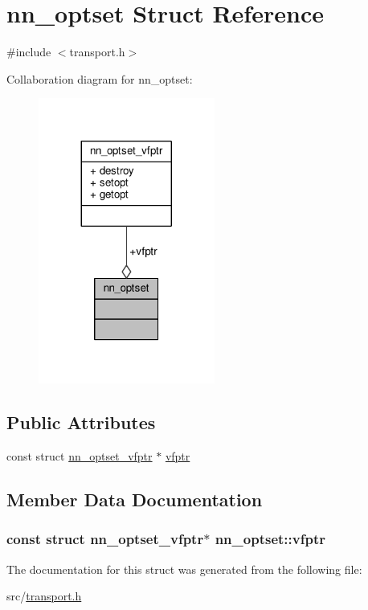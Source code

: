 \hypertarget{structnn__optset}{}\section{nn\+\_\+optset Struct Reference}
\label{structnn__optset}


{\ttfamily \#include $<$transport.\+h$>$}



Collaboration diagram for nn\+\_\+optset\+:\nopagebreak
\begin{figure}[H]
\begin{center}
\leavevmode
\includegraphics[width=164pt]{structnn__optset__coll__graph}
\end{center}
\end{figure}
\subsection*{Public Attributes}
\begin{DoxyCompactItemize}
\item 
const struct \hyperlink{structnn__optset__vfptr}{nn\+\_\+optset\+\_\+vfptr} $\ast$ \hyperlink{structnn__optset_a71dc561d46ade3014abd1e81dd3adcb3}{vfptr}
\end{DoxyCompactItemize}


\subsection{Member Data Documentation}
\subsubsection[{vfptr}]{\setlength{\rightskip}{0pt plus 5cm}const struct {\bf nn\+\_\+optset\+\_\+vfptr}$\ast$ nn\+\_\+optset\+::vfptr}\hypertarget{structnn__optset_a71dc561d46ade3014abd1e81dd3adcb3}{}\label{structnn__optset_a71dc561d46ade3014abd1e81dd3adcb3}


The documentation for this struct was generated from the following file\+:\begin{DoxyCompactItemize}
\item 
src/\hyperlink{transport_8h}{transport.\+h}\end{DoxyCompactItemize}
